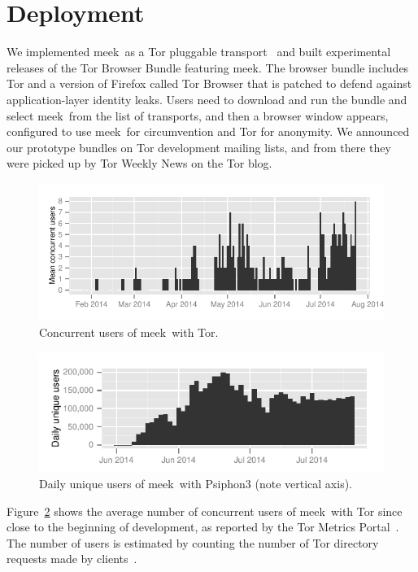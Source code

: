 \documentclass[conference]{IEEEtran}
\def\meek{meek}
\begin{document}

\section{Deployment}
\label{sec:deployment}

We implemented \meek\ as a Tor pluggable transport~\cite{pt}
and built experimental releases of the Tor Browser Bundle featuring \meek.
The browser bundle includes Tor and a version of Firefox
called Tor Browser that is patched to defend against application-layer identity leaks.
Users need to download and run the bundle and select \meek\ from the list of transports,
and then a browser window appears,
configured to use \meek\ for circumvention and Tor for anonymity.
We announced our prototype bundles on Tor development mailing lists,
and from there they were picked up by Tor Weekly News on the Tor blog.

\begin{figure}
\includegraphics[width=\linewidth]{clients-meek}
\caption{Concurrent users of \meek\ with Tor.}
\label{fig:clients}
\end{figure}

\begin{figure}
\includegraphics[width=\linewidth]{clients-psiphon3}
\caption{Daily unique users of \meek\ with Psiphon3 (note vertical axis).}
\label{fig:clients}
\end{figure}

Figure~\ref{fig:clients} shows the average number of concurrent users of \meek\ with Tor
since close to the beginning of development,
as reported by the Tor Metrics Portal~\cite{metrics-meek}.
The number of users is estimated by counting the number
of Tor directory requests made by clients~\cite{counting-daily-bridge-users}.
\end{document}
